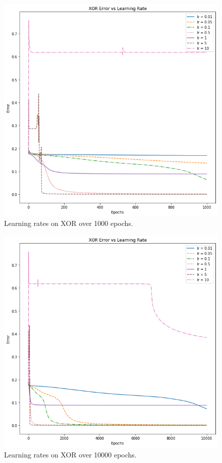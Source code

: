 \documentclass[12pt]{article}
\begin{document}
\begin{figure}
  \centering
  \includegraphics[width=\linewidth]{xor_1000.png}
  \caption{Learning rates on XOR over 1000 epochs.}
  \label{fig:xor1000}
\end{figure}

\begin{figure}
  \centering
  \includegraphics[width=\linewidth]{xor_10000.png}
  \caption{Learning rates on XOR over 10000 epochs.}
  \label{fig:xor10000}
\end{figure}


\end{document}
